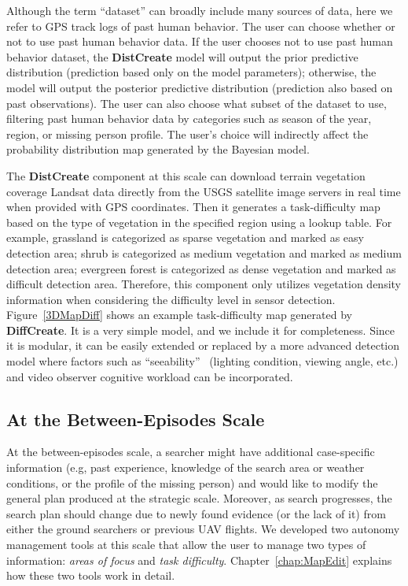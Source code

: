 Although the term ``dataset'' can broadly include many sources of data, here we refer to GPS track logs of past human behavior. The user can choose whether or not to use past human behavior data. If the user chooses not to use past human behavior dataset, the \textbf{DistCreate} model will output the prior predictive distribution (prediction based only on the model parameters); otherwise, the model will output the posterior predictive distribution (prediction also based on past observations). The user can also choose what subset of the dataset to use, filtering past human behavior data by categories such as season of the year, region, or missing person profile. The user's choice will indirectly affect the probability distribution map generated by the Bayesian model.

The \textbf{DistCreate} component at this scale can download terrain vegetation coverage Landsat data directly from the USGS satellite image servers in real time when provided with GPS coordinates. Then it generates a task-difficulty map based on the type of vegetation in the specified region using a lookup table. For example, grassland is categorized as sparse vegetation and marked as easy detection area; shrub is categorized as medium vegetation and marked as medium detection area; evergreen forest is categorized as dense vegetation and marked as difficult detection area. Therefore, this component only utilizes vegetation density information when considering the difficulty level in sensor detection. Figure~\ref{3DMapDiff} shows an example task-difficulty map generated by \textbf{DiffCreate}. It is a very simple model, and we include it for completeness. Since it is modular, it can be easily extended or replaced by a more advanced detection model where factors such as ``seeability''~\cite{Morse2010UAV} (lighting condition, viewing angle, etc.) and video observer cognitive workload can be incorporated.

\subsection{At the Between-Episodes Scale}

At the between-episodes scale, a searcher might have additional case-specific information (e.g, past experience, knowledge of the search area or weather conditions, or the profile of the missing person) and would like to modify the general plan produced at the strategic scale. Moreover, as search progresses, the search plan should change due to newly found evidence (or the lack of it) from either the ground searchers or previous UAV flights. We developed two autonomy management tools at this scale that allow the user to manage two types of information: \textit{areas of focus} and \textit{task difficulty}. Chapter~\ref{chap:MapEdit} explains how these two tools work in detail.

